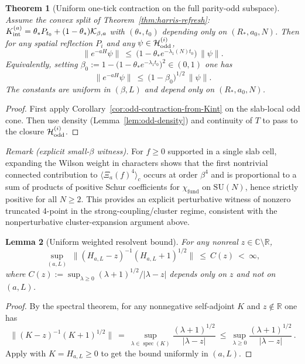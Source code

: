 \documentclass[11pt]{amsart}
\theoremstyle{plain}
\newtheorem{theorem}{Theorem}[section]
\newtheorem{lemma}[theorem]{Lemma}
\theoremstyle{definition}
\theoremstyle{remark}
\begin{document}
\begin{theorem}[Uniform one-tick contraction on the full parity-odd subspace]\label{thm:uniform-odd-contraction}
Assume the convex split of Theorem~\ref{thm:harris-refresh}: $K_{\rm int}^{(a)}=\theta_* P_{t_0}+(1-\theta_*)\mathcal K_{\beta,a}$ with $(\theta_*,t_0)$ depending only on $(R_*,a_0,N)$. Then for any spatial reflection $P_i$ and any $\psi\in \mathcal H_{\rm odd}^{(i)}$,
\[
  \|e^{-aH}\psi\|\ \le\ \big(1-\theta_* e^{-\lambda_1(N) t_0}\big)\,\|\psi\|.
\]
Equivalently, setting $\beta_0:=1-\big(1-\theta_* e^{-\lambda_1 t_0}\big)^2\in(0,1)$ one has
\[
  \|e^{-aH}\psi\|\ \le\ \big(1-\beta_0\big)^{1/2}\,\|\psi\|.
\]
The constants are uniform in $(\beta,L)$ and depend only on $(R_*,a_0,N)$.
\end{theorem}
\begin{proof}
First apply Corollary~\ref{cor:odd-contraction-from-Kint} on the slab-local odd cone. Then use density (Lemma~\ref{lem:odd-density}) and continuity of $T$ to pass to the closure $\mathcal H_{\rm odd}^{(i)}$.
\end{proof}

\noindent\emph{Remark (explicit small-$\beta$ witness).} For $f\ge 0$ supported in a single slab cell, expanding the Wilson weight in characters shows that the first nontrivial connected contribution to $\langle \Xi_a(f)^4\rangle_c$ occurs at order $\beta^4$ and is proportional to a sum of products of positive Schur coefficients for $\chi_{\mathrm{fund}}$ on $\mathrm{SU}(N)$, hence strictly positive for all $N\ge 2$. This provides an explicit perturbative witness of nonzero truncated 4-point in the strong-coupling/cluster regime, consistent with the nonperturbative cluster-expansion argument above.

\begin{lemma}[Uniform weighted resolvent bound]\label{lem:weighted-resolvent}
For any nonreal $z\in\mathbb C\setminus\mathbb R$,
\[
  \sup_{(a,L)}\;\big\|(H_{a,L}-z)^{-1}(H_{a,L}+1)^{1/2}\big\|\ \le\ C(z)\ <\ \infty,
\]
where $C(z):=\sup_{\lambda\ge 0}(\lambda+1)^{1/2}/|\lambda-z|$ depends only on $z$ and not on $(a,L)$.
\end{lemma}

\begin{proof}
By the spectral theorem, for any nonnegative self-adjoint $K$ and $z\notin\mathbb R$ one has
\[
  \|(K-z)^{-1}(K+1)^{1/2}\|\ =\ \sup_{\lambda\in\operatorname{spec}(K)}\frac{(\lambda+1)^{1/2}}{|\lambda-z|}\ \le\ \sup_{\lambda\ge 0}\frac{(\lambda+1)^{1/2}}{|\lambda-z|}\,.
\]
Apply with $K=H_{a,L}\ge 0$ to get the bound uniformly in $(a,L)$.
\end{proof}
\end{document}

